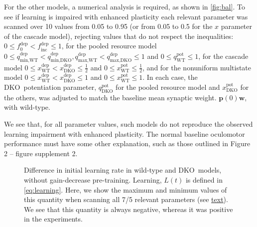 \documentclass[10pt]{article}
\renewenvironment{myenumA}{\begin{inparaenum}[\bfseries A]}{\end{inparaenum}}
\newcommand{\pr}{\mathbf{p}}
\newcommand{\w}{\mathbf{w}}
\newcommand{\pot}{^{\text{pot}}}
\newcommand{\dep}{^{\text{dep}}}
\newcommand{\norm}{_0}
\newcommand{\inc}{_{\text{inc}}}
\newcommand{\wt}{_{\text{WT}}}
\newcommand{\ko}{_{\text{\KO}}}
\newcommand{\KO}{DKO}
\newcommand{\compfig}[1][A]{Figure 2 -- figure supplement 2#1}
\begin{document}
For the other models, a numerical analysis is required, as shown in \autoref{fig:bal}.
\hypertarget{par:bal_scan}{To} see if learning is impaired with enhanced plasticity each relevant parameter was scanned over 10 values from 0.05 to 0.95 (or from 0.05 to 0.5 for the $x$ parameter of the cascade model), rejecting values that do not respect the inequalities:
$0 \leq f\dep\norm < f\dep\inc \leq 1$, for the pooled resource model $0 \leq q\dep_\text{min,WT} < q\dep_\text{min,\KO}, q\dep_\text{max,WT} < q\dep_\text{max,\KO} \leq 1$ and $0 \leq q\pot\wt \leq 1$, for the cascade model $0 \leq x\dep\wt < x\dep\ko \leq \frac{1}{2}$ and $0 \leq x\pot\wt \leq \frac{1}{2}$, and for the nonuniform multistate model $0 \leq x\dep\wt < x\dep\ko \leq 1$ and $0 \leq x\pot\wt \leq 1$.
In each case, the \KO\ potentiation parameter, $q\pot\ko$ for the pooled resource model and $x\pot\ko$ for the others, was adjusted to match the baseline mean synaptic weight. $\pr(0)\w$, with wild-type.


We see that, for all parameter values, such models do not reproduce the observed learning impairment with enhanced plasticity.
The normal baseline oculomotor performance must have some other explanation, such as those outlined in \compfig[].




\begin{figure}
\begin{preview}
  \centering
  \begin{myenumA}
    \item{}\label{fig:pooled_bal}
    \item{}\label{fig:cascade_bal}
    \item{}\label{fig:nonuni_bal}
  \end{myenumA}
\end{preview}
  \caption{Difference in initial learning rate in wild-type and \KO\ models, without gain-decrease pre-training.
  Learning, $L(t)$ is defined in \eqref{eq:learning}.
  Here, we show the maximum and minimum values of this quantity when scanning all 7/5 relevant parameters (see \protect\hyperlink{par:bal_scan}{text}).
  We see that this quantity is always negative, whereas it was positive in the experiments.
  }\label{fig:bal}
\end{figure}








\end{document}

